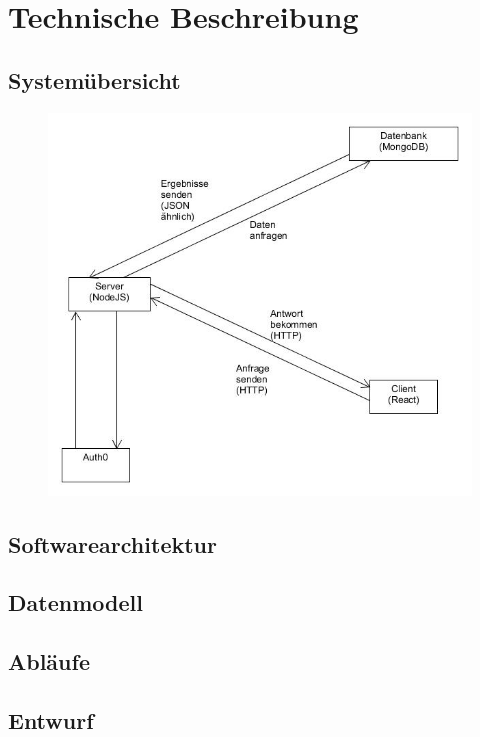 	
\section{Technische Beschreibung}
	
	\subsection{Systemübersicht}
	
		\begin{figure}[H]
			\includegraphics[scale=0.8]{images/SYCArchitektur}
		\end{figure}
	
	\subsection{Softwarearchitektur}
	
	\subsection{Datenmodell}
	
	\subsection{Abläufe}
	
	\subsection{Entwurf}
	

